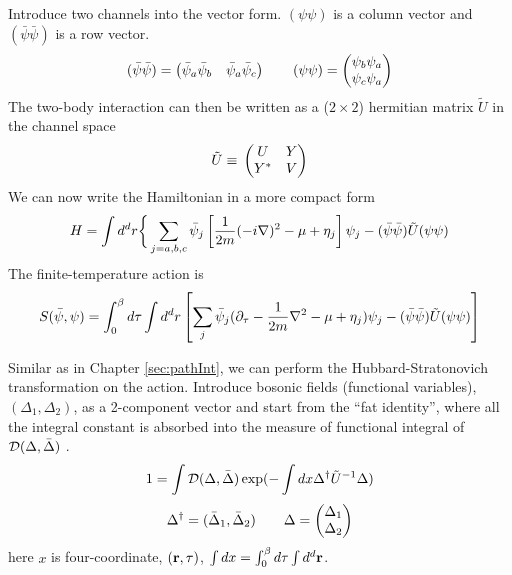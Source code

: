 Introduce two channels into the vector form.    $(\psi\psi)$  is a column vector and $(\bar\psi\bar\psi)$ is a row vector.
\begin{equation*}
(\bar\psi\bar\psi)=\begin{pmatrix}\bar\psi_{a}\bar\psi_{b}&\bar\psi_{a}\bar\psi_{c}\end{pmatrix}
\qquad(\psi\psi)=\begin{pmatrix}\psi_{b}\psi_{a}\\\psi_{c}\psi_{a}\end{pmatrix}
\end{equation*}
The two-body interaction can then be written as a ($2\times2$)  hermitian  matrix  $\tilde{U}$ in the channel space
\begin{equation}
\tilde{U}\equiv{}\begin{pmatrix}U&Y\\Y^{*}&V\end{pmatrix}
\end{equation}
We can now write the Hamiltonian in a more compact form
\begin{equation}
H=\int{d^{d}r}\bigg\{\sum_{j={a,b,c}}\bar\psi_{j}\left[\frac{1}{2m}(-i\nabla)^{2}-\mu+\eta_{j}\right]\psi_{j}
 	-(\bar\psi\bar\psi)\tilde{U}(\psi\psi)
\end{equation}
The finite-temperature action is 
\begin{equation}\label{eq:pathInt2:actionFermi}
S(\bar\psi,\psi)=\int^{\beta}_{0}d\tau\int{d^{d}r}\left[\sum_{j}\bar\psi_{j}(\partial_\tau-\frac{1}{2m}\nabla^{2}-\mu+\eta_{j})\psi_{j}
-(\bar\psi\bar\psi)\tilde{U}(\psi\psi)\right]
\end{equation}



Similar as in Chapter \ref{sec:pathInt}, we can perform the Hubbard-Stratonovich transformation on the action.   Introduce bosonic fields (functional variables), $(\Delta_{1},\Delta_{2})$, as a 2-component vector   and start from the ``fat identity'', where  all the integral constant is absorbed into the measure of functional integral of $\mathcal{D}(\Delta,\bar\Delta)$ \cite{Altland}.
\begin{equation}\label{eq:pathInt2:identity}
1=\int{\ensuremath{\mathcal{D}}(\Delta,\bar\Delta)}\exp(-\int{dx}\Delta^{\dagger}\tilde{U}^{-1}\Delta)
\end{equation}
\[
\Delta^{\dagger}=(\bar\Delta_{1},\bar\Delta_{2})\qquad\Delta=\begin{pmatrix}\Delta_{1}\\\Delta_{2}\end{pmatrix}
\]
here $x$ is four-coordinate, $(\mathbf{r}, \tau)$,  $\int{dx}=\int^{\beta}_{0}d\tau\int{d^{d}\ensuremath{\mathbf{r}}}$. 

